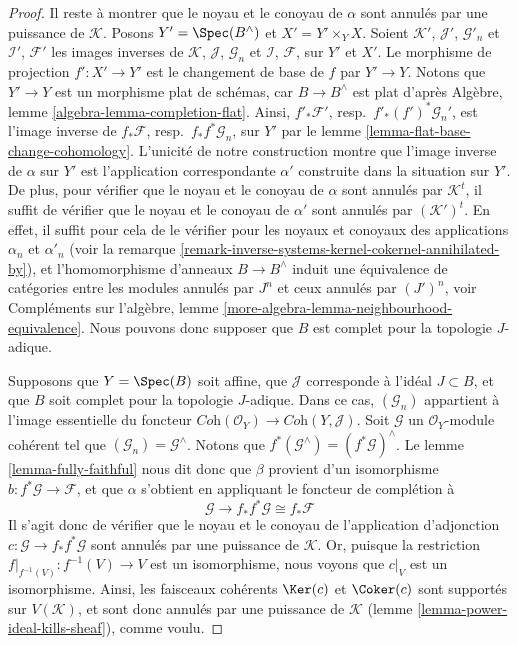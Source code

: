 \begin{proof}
\medskip\noindent
Il reste à montrer que le noyau et le conoyau de $\alpha$ sont
annulés par une puissance de $\mathcal{K}$. Posons $Y' = \Spec(B^\wedge)$
et $X' = Y' \times_Y X$. Soient $\mathcal{K}'$, $\mathcal{J}'$, $\mathcal{G}'_n$
et $\mathcal{I}'$, $\mathcal{F}'$ les images inverses de
$\mathcal{K}$, $\mathcal{J}$, $\mathcal{G}_n$ et
$\mathcal{I}$, $\mathcal{F}$, sur $Y'$ et $X'$.
Le morphisme de projection $f' : X' \to Y'$ est le changement de base de
$f$ par $Y' \to Y$. Notons que $Y' \to Y$ est un morphisme plat de schémas,
car $B \to B^\wedge$ est plat d'après
Algèbre, lemme \ref{algebra-lemma-completion-flat}.
Ainsi, $f'_*\mathcal{F}'$, resp.\ $f'_*(f')^*\mathcal{G}_n'$,
est l'image inverse de $f_*\mathcal{F}$, resp.\ $f_*f^*\mathcal{G}_n$,
sur $Y'$ par le lemme \ref{lemma-flat-base-change-cohomology}.
L'unicité de notre construction montre que l'image inverse de $\alpha$ sur $Y'$
est l'application correspondante $\alpha'$ construite dans la situation sur $Y'$.
De plus, pour vérifier que le noyau et le conoyau de $\alpha$ sont
annulés par $\mathcal{K}^t$, il suffit de vérifier que le
noyau et le conoyau de $\alpha'$ sont annulés par
$(\mathcal{K}')^t$. En effet, il suffit pour cela de le vérifier pour
les noyaux et conoyaux des applications $\alpha_n$ et $\alpha'_n$
(voir la remarque \ref{remark-inverse-systems-kernel-cokernel-annihilated-by}),
et l'homomorphisme d'anneaux $B \to B^\wedge$ induit
une équivalence de catégories entre les modules annulés par
$J^n$ et ceux annulés par $(J')^n$, voir
Compléments sur l'algèbre, lemme \ref{more-algebra-lemma-neighbourhood-equivalence}.
Nous pouvons donc supposer que $B$ est complet pour la topologie $J$-adique.

\medskip\noindent
Supposons que $Y = \Spec(B)$ soit affine, que $\mathcal{J}$ corresponde à l'idéal
$J \subset B$, et que $B$ soit complet pour la topologie $J$-adique.
Dans ce cas, $(\mathcal{G}_n)$ appartient à l'image essentielle du foncteur
$\textit{Coh}(\mathcal{O}_Y) \to \textit{Coh}(Y, \mathcal{J})$.
Soit $\mathcal{G}$ un $\mathcal{O}_Y$-module cohérent tel que
$(\mathcal{G}_n) = \mathcal{G}^\wedge$. Notons que
$f^*(\mathcal{G}^\wedge) = (f^*\mathcal{G})^\wedge$. Le
lemme \ref{lemma-fully-faithful}
nous dit donc que $\beta$ provient d'un isomorphisme
$b : f^*\mathcal{G} \to \mathcal{F}$,
et que $\alpha$ s'obtient en appliquant le foncteur de complétion à
$$
\mathcal{G} \to f_*f^*\mathcal{G} \cong f_*\mathcal{F}
$$
Il s'agit donc de vérifier que le noyau et le conoyau de
l'application d'adjonction $c : \mathcal{G} \to f_*f^*\mathcal{G}$ sont annulés par
une puissance de $\mathcal{K}$. Or, puisque la restriction
$f|_{f^{-1}(V)} : f^{-1}(V) \to V$ est un isomorphisme,
nous voyons que $c|_V$ est un isomorphisme. Ainsi, les faisceaux cohérents
$\Ker(c)$ et $\Coker(c)$ sont supportés sur $V(\mathcal{K})$,
et sont donc annulés par une puissance de $\mathcal{K}$
(lemme \ref{lemma-power-ideal-kills-sheaf}), comme voulu.
\end{proof}

